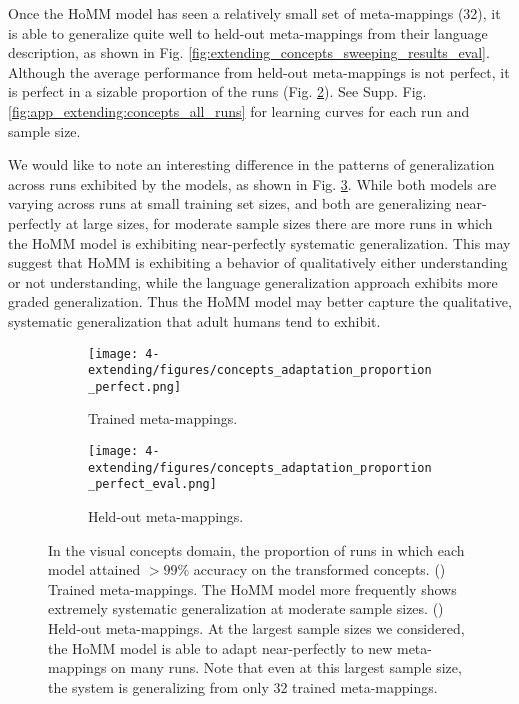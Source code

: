 Once the HoMM model has seen a relatively small set of meta-mappings (32), it is able to generalize quite well to held-out meta-mappings from their language description, as shown in Fig. \ref{fig:extending_concepts_sweeping_results_eval}. Although the average performance from held-out meta-mappings is not perfect, it is perfect in a sizable proportion of the runs (Fig. \ref{fig:extending_concepts_perfect:eval}). See Supp. Fig. \ref{fig:app_extending:concepts_all_runs} for learning curves for each run and sample size. \par

We would like to note an interesting difference in the patterns of generalization across runs exhibited by the models, as shown in Fig. \ref{fig:extending_concepts_perfect}. While both models are varying across runs at small training set sizes, and both are generalizing near-perfectly at large sizes, for moderate sample sizes there are more runs in which the HoMM model is exhibiting near-perfectly systematic generalization. This may suggest that HoMM is exhibiting a behavior of qualitatively either understanding or not understanding, while the language generalization approach exhibits more graded generalization. Thus the HoMM model may better capture the qualitative, systematic generalization that adult humans tend to exhibit.

\begin{figure}[htb]
\begin{subfigure}{0.5\textwidth}
\texttt{[image: 4-extending/figures/concepts\_adaptation\_proportion\_perfect.png]}
\caption{Trained meta-mappings.}\label{fig:extending_concepts_perfect:train}
\end{subfigure}%
\begin{subfigure}{0.5\textwidth}
\texttt{[image: 4-extending/figures/concepts\_adaptation\_proportion\_perfect\_eval.png]}
\caption{Held-out meta-mappings.}\label{fig:extending_concepts_perfect:eval}
\end{subfigure}
\caption{In the visual concepts domain, the proportion of runs in which each model attained \(> 99\)\% accuracy on the transformed concepts. () Trained meta-mappings. The HoMM model more frequently shows extremely systematic generalization at moderate sample sizes. () Held-out meta-mappings. At the largest sample sizes we considered, the HoMM model is able to adapt near-perfectly to new meta-mappings on many runs. Note that even at this largest sample size, the system is generalizing from only 32 trained meta-mappings.}\label{fig:extending_concepts_perfect}

\end{figure}



